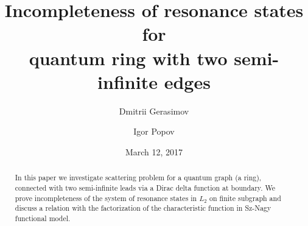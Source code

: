 \documentclass{birkjour}
\theoremstyle{definition}
\theoremstyle{remark}
\numberwithin{equation}{section}
\begin{document}
%
%
%
%
%
%
%
%
%


\title[Incompleteness of resonance states]
 {Incompleteness of resonance states for \\
 quantum ring with two semi-infinite edges}



\author[D.A. Gerasimov]{Dmitrii Gerasimov}
\address{
ITMO University\\
Saint Petersburg, Russia
}

\author[I. Y. Popov]{Igor Popov}
\address{
ITMO University\\
Saint Petersburg, Russia
}


\date{March 12, 2017}

\begin{abstract}
In this paper we investigate scattering problem for a quantum graph (a ring), connected
with two semi-infinite leads via a Dirac delta function at boundary. We prove
incompleteness of the system of resonance states in $L_2$ on finite subgraph and
discuss a relation with the factorization of the characteristic function in Sz-Nagy functional model.
\end{abstract}

\maketitle
\end{document}
